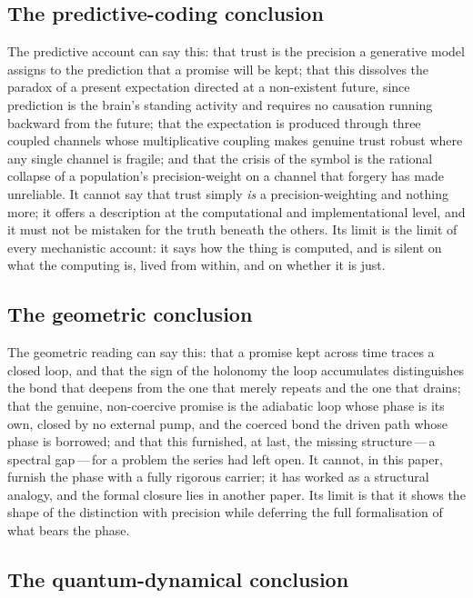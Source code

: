 \subsection*{The predictive-coding conclusion}
\label{p13:sub:concl-pc}

The predictive account can say this: that trust is the precision a generative model assigns to the prediction that a promise will be kept; that this dissolves the paradox of a present expectation directed at a non-existent future, since prediction is the brain's standing activity and requires no causation running backward from the future; that the expectation is produced through three coupled channels whose multiplicative coupling makes genuine trust robust where any single channel is fragile; and that the crisis of the symbol is the rational collapse of a population's precision-weight on a channel that forgery has made unreliable. It cannot say that trust simply \emph{is} a precision-weighting and nothing more; it offers a description at the computational and implementational level, and it must not be mistaken for the truth beneath the others. Its limit is the limit of every mechanistic account: it says how the thing is computed, and is silent on what the computing is, lived from within, and on whether it is just.

\subsection*{The geometric conclusion}
\label{p13:sub:concl-geo}

The geometric reading can say this: that a promise kept across time traces a closed loop, and that the sign of the holonomy the loop accumulates distinguishes the bond that deepens from the one that merely repeats and the one that drains; that the genuine, non-coercive promise is the adiabatic loop whose phase is its own, closed by no external pump, and the coerced bond the driven path whose phase is borrowed; and that this furnished, at last, the missing structure\,---\,a spectral gap\,---\,for a problem the series had left open. It cannot, in this paper, furnish the phase with a fully rigorous carrier; it has worked as a structural analogy, and the formal closure lies in another paper. Its limit is that it shows the shape of the distinction with precision while deferring the full formalisation of what bears the phase.

\subsection*{The quantum-dynamical conclusion}
\label{p13:sub:concl-quantum}

